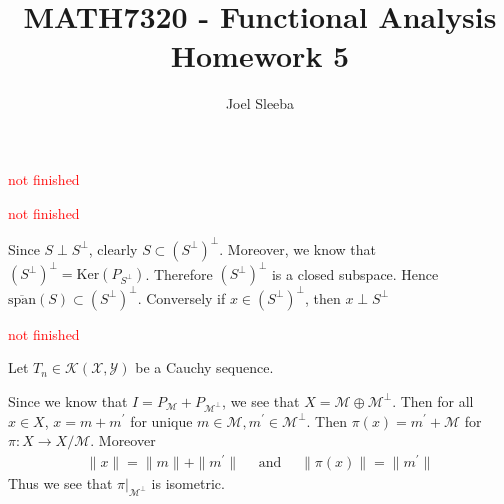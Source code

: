 \documentclass[12pt]{exam}
\theoremstyle{plain} %
\theoremstyle{definition} %
\theoremstyle{remark} %
\begin{document}
\title{MATH7320 - Functional Analysis \\ Homework 5}

\author{
  Joel Sleeba \\
}

\maketitle
\printanswers
\unframedsolutions

\begin{questions}

  \question
  \textcolor{red}{not finished}
  \begin{solution}

  \end{solution}

  \question
  \textcolor{red}{not finished}
  \begin{solution}
    Since $S \perp S^\perp$, clearly $S \subset (S^\perp)^\perp$.
    Moreover, we know that $(S^\perp)^\perp =
    \textrm{Ker}(P_{S^\perp})$. Therefore $(S^\perp)^\perp$ is a
    closed subspace. Hence $\overline{\textrm{span}}(S) \subset
    (S^\perp)^\perp$. Conversely if $x \in (S^\perp)^\perp$, then $x
    \perp S^\perp$
  \end{solution}

  \question
  \textcolor{red}{not finished}
  \begin{solution}
    Let $T_n \in \mathcal{K}(\mathcal{X}, \mathcal{Y})$ be a Cauchy sequence.
  \end{solution}

  \question
  \begin{solution}
    Since we know that $I = P_{\mathcal{M}} + P_{\mathcal{M}^\perp}$,
    we see that $X = \mathcal{M} \oplus \mathcal{M}^\perp$. Then for
    all $x \in X$, $x = m + m^\prime$ for unique $m \in \mathcal{
    M}, m^\prime \in \mathcal{M}^\perp$. Then $\pi(x) = m^\prime +
    \mathcal{M}$ for $\pi: X \to X/\mathcal{M}$. Moreover
    \begin{align*}
      \|x\| = \|m\| + \|m^\prime\| \quad \textrm{ and } \quad
      \|\pi(x)\| = \|m^\prime\|
    \end{align*}
    Thus we see that $\pi|_{\mathcal{M}^\perp}$ is isometric.
  \end{solution}

  \question
  \begin{solution}

  \end{solution}


\end{questions}
\end{document}
